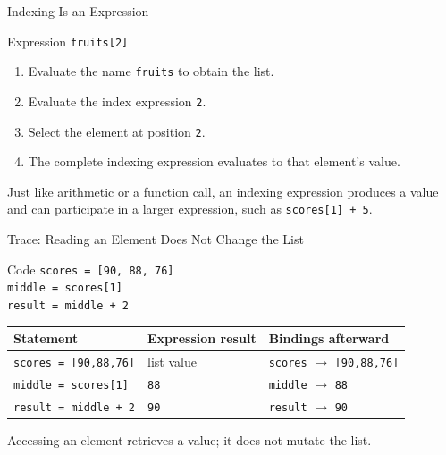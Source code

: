\documentclass[aspectratio=169,10pt]{beamer}
\begin{document}
\begin{frame}{Indexing Is an Expression}
  \begin{block}{Expression}
    \centering
    \Large\texttt{fruits[2]}
  \end{block}

  \begin{enumerate}
    \item Evaluate the name \texttt{fruits} to obtain the list.
    \item Evaluate the index expression \texttt{2}.
    \item Select the element at position \texttt{2}.
    \item The complete indexing expression evaluates to that element's value.
  \end{enumerate}

  \begin{keyidea}
    Just like arithmetic or a function call, an indexing expression produces a value and can participate in a larger expression, such as \texttt{scores[1] + 5}.
  \end{keyidea}
\end{frame}

\begin{frame}{Trace: Reading an Element Does Not Change the List}
  \begin{block}{Code}
    \texttt{scores = [90, 88, 76]}\\
    \texttt{middle = scores[1]}\\
    \texttt{result = middle + 2}
  \end{block}

  \begin{center}
    \renewcommand{\arraystretch}{1.3}
    \begin{tabular}{l|l|l}
      \textbf{Statement} & \textbf{Expression result} & \textbf{Bindings afterward} \\\hline
      \texttt{scores = [90,88,76]} & list value & \texttt{scores} $\rightarrow$ \texttt{[90,88,76]} \\
      \texttt{middle = scores[1]} & \texttt{88} & \texttt{middle} $\rightarrow$ \texttt{88} \\
      \texttt{result = middle + 2} & \texttt{90} & \texttt{result} $\rightarrow$ \texttt{90}
    \end{tabular}
  \end{center}

  \begin{keyidea}
    Accessing an element retrieves a value; it does not mutate the list.
  \end{keyidea}
\end{frame}
\end{document}
